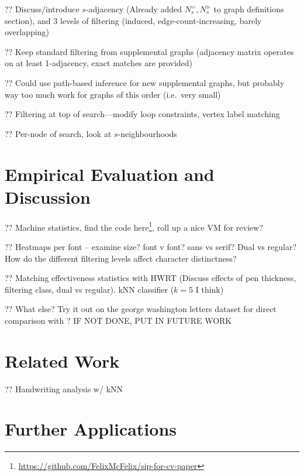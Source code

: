 \documentclass{mpaper}
\begin{document}
?? Discuss/introduce $s$-adjacency (Already added $N^{=}_{s},N^{\succcurlyeq}_{s}$ to graph definitions section), and 3 levels of filtering (induced, edge-count-increasing, barely overlapping)

?? Keep standard filtering from supplemental graphs (adjacency matrix operates on at least 1-adjacency, exact matches are provided)

?? Could use path-based inference for new supplemental graphs, but probably way too much work for graphs of this order (i.e.\ very small)

?? Filtering at top of search---modify loop constraints, vertex label matching

?? Per-node of search, look at $s$-neighbourhoods

\section{Empirical Evaluation and Discussion}
\label{sec:evaluation}

?? Machine statistics, find the code here\footnote{\url{https://github.com/FelixMcFelix/sip-for-cv-paper}}, roll up a nice VM for review?

?? Heatmaps per font -- examine size? font v font? sans vs serif? Dual vs regular? How do the different filtering levels affect character distinctness?

?? Matching effectiveness statistics with HWRT \cite{HwrtDatabase} (Discuss effects of pen thickness, filtering class, dual vs regular). kNN classifier ($k=5$ I think)

?? What else? Try it out on the george washington letters dataset for direct comparison with \cite{Graphs-Handwriting}? IF NOT DONE, PUT IN FUTURE WORK

\section{Related Work}
\label{sec:related}

?? Handwriting analysis w/ kNN \cite{Graphs-Handwriting}

\section{Further Applications}
\label{sec:applications}
\end{document}
